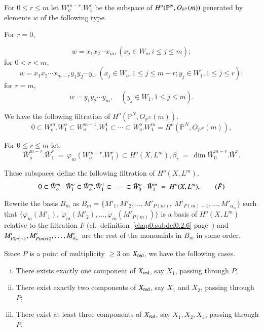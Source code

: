 For $0 \le r \le m$ let $W_o^{m-r}. W_1^r$ be the subspace of $H^o
(\mathbb{P}^N,\break O_{\mathbb{P}^N}(m))$ generated by elements $w$ of the
following type. 

For $r = 0$,

$$
w = x_1x_2 \cdots x_m , (x_j \in W_o, i \le j \le m); 
$$
 for $0 < r < m$, 
$$
w = x_1 x_2 \cdots x_{m-r} y_1 y_2 \cdots y_r, (x_j \in W_o, 1
\le j \le m-r ; y_j \in W_1, 1 \le j \le r) ; 
$$
for $r = m$,\pageoriginale
$$
w = y_1 y_2 \cdots y_m, \quad  (y_j \in W_1, 1 \le j \le m).
$$

\noindent
We have the following filtration of $H^o (\mathbb{P}^N,
O_{\mathbb{P}^N}(m))$. 
\begin{equation*}
0 \subset W_o^m. W_1^o \subset W_o^{m-1}. W_1^1 \subset \cdots \subset
W^o_o . W_1^m = H^o (\mathbb{P}^N, O_{\mathbb{P}^N} (m)),  \tag{F} 
\end{equation*}

\noindent
For $0 \le r \le m $ let, 
$$ 
\bar{W}_o^{m-r} . \bar{W}^{r}_1 ~ = ~ \varphi_m (W_o^{m-r}. W_1^r)
\subset H^o (X, L^m), \beta_r ~ = ~ \dim
\bar{W}^{m-r}_{0}. \bar{W}^{r}.  
$$

\noindent
These subspaces define the following filtration of $H^o (X, L^m)$.
\begin{equation*}
0 \subset \bar{W}^{m}_o  \cdot \bar{W}^o_1 \subset \bar{W}^m_o. \bar{W}^1_1
\subset ~ \cdots ~ \subset \bar{W}^o_0 \cdot \bar{W}^m_1 ~ = ~ H^o (X,
L^m), \tag{$\bar{F}$} 
\end{equation*}

\noindent
Rewrite the basis $B_m$ as $B_m = \{ M'_1, M'_2, \ldots ,
M'_{P(m)}, ~ M'_{P(m)+1}, \ldots , M'_{\alpha_m}\}$ such that $\{
\varphi_m (M'_1), ~ \varphi_m (M'_2), \ldots , \varphi_m
(M'_{P(m)})\}$ is a basis of $H^o (X, L^m)$ relative to the filtration
$\bar{F}$ (cf.\ definition~\ref{chap0:subdef0.2.6} 
page~\pageref{chap0:subdef0.2.6}) and $M'_{P(m)+1},\break  
M'_{P(m)+2}, \ldots , M'_{\alpha_m}$ are the rest of the monomials in
$B_m$ in some order. 

Since $P$ is a point of multiplicity $\ge 3$ on $X_{\operatorname{red}}$, we have
the following cases. 
\begin{enumerate}[i)]
\item There exists exactly one component of $X_{\operatorname{red}}$, say $X_{1}$,
  passing through $P$; 

\item There exist exactly two components of $X_{\operatorname{red}}$, say $X_1$ and
  $X_{2}$, passing through $P$; 

\item There exist at least three components of $X_{\operatorname{red}}$, say $X_1,
  X_2, X_3$, passing through $P$. 
\end{enumerate}

